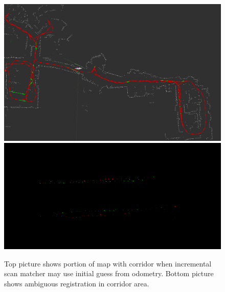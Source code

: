 \begin{figure}
	\centering
	\includegraphics[width=140mm]{../img/coridor.png}
	\includegraphics[width=140mm]{../img/coridor2.png}

	\caption{Top picture shows portion of map with corridor when incremental scan matcher may use initial guess from odometry. Bottom picture shows ambiguous registration in corridor area.}\label{fig:corridor}
\end{figure}
